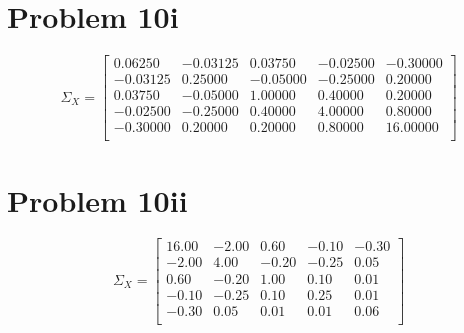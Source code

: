 \documentclass{article}
\begin{document}
\section*{Problem 10i}
\begin{equation*}
\Sigma_X =
\begin{bmatrix}{}
  0.06250 & -0.03125 & 0.03750 & -0.02500 & -0.30000 \\ 
  -0.03125 & 0.25000 & -0.05000 & -0.25000 & 0.20000 \\ 
  0.03750 & -0.05000 & 1.00000 & 0.40000 & 0.20000 \\ 
  -0.02500 & -0.25000 & 0.40000 & 4.00000 & 0.80000 \\ 
  -0.30000 & 0.20000 & 0.20000 & 0.80000 & 16.00000 \\ 
  \end{bmatrix}
\end{equation*}

\section*{Problem 10ii}
\begin{equation*}
\Sigma_X =
\begin{bmatrix}{}
  16.00 & -2.00 & 0.60 & -0.10 & -0.30 \\ 
  -2.00 & 4.00 & -0.20 & -0.25 & 0.05 \\ 
  0.60 & -0.20 & 1.00 & 0.10 & 0.01 \\ 
  -0.10 & -0.25 & 0.10 & 0.25 & 0.01 \\ 
  -0.30 & 0.05 & 0.01 & 0.01 & 0.06 \\ 
  \end{bmatrix}
\end{equation*}
\end{document}
